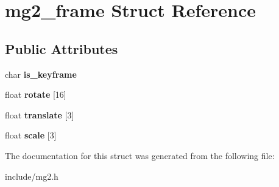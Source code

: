 \hypertarget{structmg2__frame}{}\section{mg2\+\_\+frame Struct Reference}
\label{structmg2__frame}
\subsection*{Public Attributes}
\begin{DoxyCompactItemize}
\item 
\mbox{\label{structmg2__frame_a2762c5b7d2b5a6fe182235c69e510d21}} 
char {\bfseries is\+\_\+keyframe}
\item 
\mbox{\label{structmg2__frame_ad0301a9960f8908da384479f846924cf}} 
float {\bfseries rotate} \mbox{[}16\mbox{]}
\item 
\mbox{\label{structmg2__frame_a3709feba21e54155ca961f0b335c163d}} 
float {\bfseries translate} \mbox{[}3\mbox{]}
\item 
\mbox{\label{structmg2__frame_a16a198b1823d5d3ebb46b71cacd451a5}} 
float {\bfseries scale} \mbox{[}3\mbox{]}
\end{DoxyCompactItemize}


The documentation for this struct was generated from the following file\+:\begin{DoxyCompactItemize}
\item 
include/mg2.\+h\end{DoxyCompactItemize}
